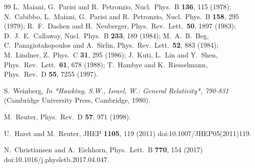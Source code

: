 \documentclass[%
 reprint,
 superscriptaddress,
preprintnumbers,
nofootinbib,
 amsmath,amssymb,
 aps,
prl,
]{revtex4-1}
\begin{document}
\begin{thebibliography}{99}
 L.~Maiani, G.~Parisi and R.~Petronzio,
  Nucl.\ Phys.\ B {\bf 136}, 115 (1978);
  N.~Cabibbo, L.~Maiani, G.~Parisi and R.~Petronzio,
  Nucl.\ Phys.\ B {\bf 158}, 295 (1979);
 R.~F.~Dashen and H.~Neuberger,
  Phys.\ Rev.\ Lett.\  {\bf 50}, 1897 (1983);
  D.~J.~E.~Callaway,
  Nucl.\ Phys.\ B {\bf 233}, 189 (1984);
  M.~A.~B.~Beg, C.~Panagiotakopoulos and A.~Sirlin,
  Phys.\ Rev.\ Lett.\  {\bf 52}, 883 (1984);
  M.~Lindner,
  Z.\ Phys.\ C {\bf 31}, 295 (1986);
  J.~Kuti, L.~Lin and Y.~Shen,
  Phys.\ Rev.\ Lett.\  {\bf 61}, 678 (1988);
 T.~Hambye and K.~Riesselmann,
  Phys.\ Rev.\ D {\bf 55}, 7255 (1997).
  
 
  S.~Weinberg,
{\it  In *Hawking, S.W., Israel, W.: General Relativity*, 790-831}
(Cambridge University Press, Cambridge, 1980).

  M.~Reuter,
  Phys.\ Rev.\ D {\bf 57}, 971 (1998).
  
  U.~Harst and M.~Reuter,
  JHEP {\bf 1105}, 119 (2011)
  doi:10.1007/JHEP05(2011)119.
 
  N.~Christiansen and A.~Eichhorn,
  Phys.\ Lett.\ B {\bf 770}, 154 (2017)
  doi:10.1016/j.physletb.2017.04.047.
  

\end{thebibliography}
\end{document}
